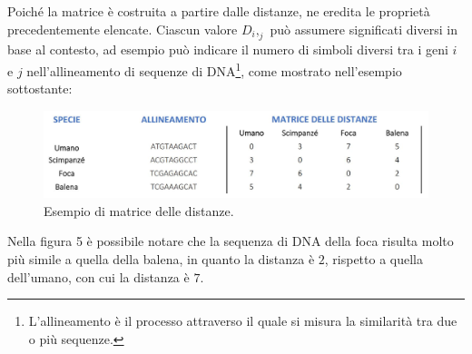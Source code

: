 Poiché la matrice è costruita a partire dalle distanze, ne eredita le proprietà precedentemente elencate.
\newline
Ciascun valore $D_i,_j$ può assumere significati diversi in base al contesto, ad esempio può indicare il numero di simboli diversi tra i geni $i$ e $j$ nell'allineamento di sequenze di DNA\footnote{L'allineamento è il processo attraverso il quale si misura la similarità tra due o più sequenze.}, come mostrato nell'esempio sottostante:
\begin{figure}[h!]
	\includegraphics[width=\linewidth]{distance_matrix_example.jpg}
 	\caption{Esempio di matrice delle distanze.}
  	\label{fig:DistanceMatrix}
\end{figure}
\newline
Nella figura 5 è possibile notare che la sequenza di DNA della foca risulta molto più simile a quella della balena, in quanto la distanza è $2$, rispetto a quella dell'umano, con cui la distanza è $7$.
\newpage

